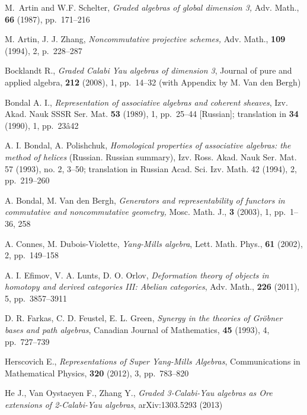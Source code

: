 \documentclass{amsart}
\numberwithin{equation}{section}
\theoremstyle{plain}
\theoremstyle{definition}
\begin{document}
\begin{thebibliography}{Biblio}

 M.~Artin and W.F. Schelter, {\it Graded algebras of global dimension 3,}
Adv. Math., {\bf 66} (1987), pp.~171--216

 M. Artin, J.  J. Zhang,
{\it Noncommutative projective schemes,} Adv. Math.,  {\bf  109}  (1994),  2,
p.~228--287

 Bocklandt R., {\em Graded Calabi Yau algebras of dimension 3}, Journal of pure and applied algebra, {\bf 212} (2008), 1, pp.~14--32 (with Appendix by M. Van den Bergh)

 
  

 Bondal A. I.,  {\em Representation of associative algebras and coherent sheaves},  Izv. Akad. Nauk SSSR Ser. Mat. {\bf 53} (1989), 1, pp.~25--44 [Russian]; translation in
{\bf 34} (1990), 1, pp.~23â42

 A. I. Bondal, A. Polishchuk, {\em Homological properties of associative algebras: the method of helices} (Russian. Russian summary), Izv. Ross. Akad. Nauk Ser. Mat. 57 (1993), no. 2, 3--50; translation in
Russian Acad. Sci. Izv. Math. 42 (1994), 2, pp.~219--260

 A. Bondal, M. Van den Bergh, {\it  Generators and representability of
functors in commutative and noncommutative geometry,}  Mosc. Math.
J.,  {\bf 3}  (2003),  1, pp.~1--36, 258

 A. Connes, M. Dubois-Violette, {\em Yang-Mills algebra},
 Lett. Math. Phys., {\bf 61} (2002), 2, pp.~149--158

  A. I. Efimov, V. A. Lunts, D. O. Orlov, {\it Deformation theory of objects in homotopy and derived categories III: Abelian categories}, Adv. Math., {\bf 226} (2011), 5, pp.~3857--3911

 D. R. Farkas, C. D. Feustel, E. L. Green, 
{\em Synergy in the theories of Gr\"obner bases and path algebras}, Canadian Journal of Mathematics, 
{\bf 45} (1993), 4, pp.~727--739

 Herscovich E., {\em  Representations of Super Yang-Mills Algebras}, Communications in Mathematical Physics, {\bf 320} (2012), 3,  pp.~783--820

 He J., Van Oystaeyen F., Zhang Y., {\em Graded 3-Calabi-Yau algebras as Ore extensions of 2-Calabi-Yau algebras}, arXiv:1303.5293 (2013)


\end{thebibliography}
\end{document}
